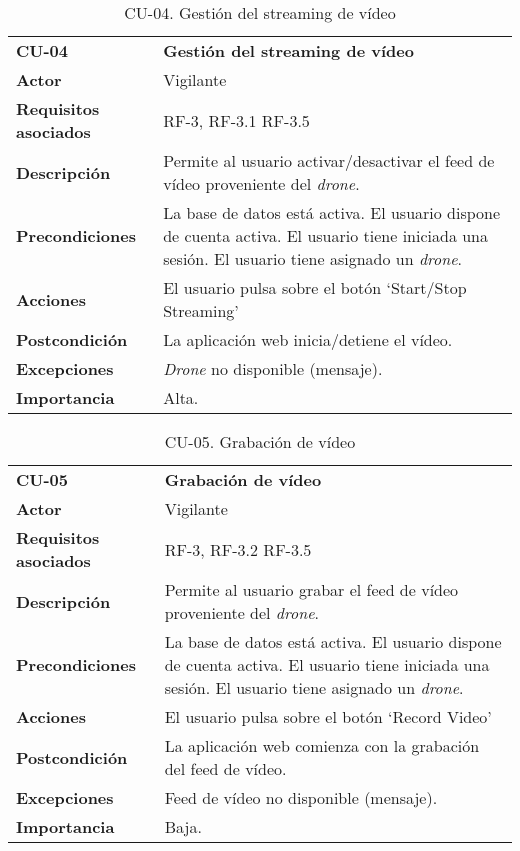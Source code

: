 \begin{table}
	\begin{center}
		\begin{tabular}{m{3cm}  m{10cm}}\hline
			\toprule
			\textbf{CU-04} & \textbf{Gestión del streaming de vídeo}\\
			\otoprule
			\textbf{Actor} & Vigilante\\
			\textbf{Requisitos asociados} & RF-3, RF-3.1 RF-3.5\\
			\textbf{Descripción} & Permite al usuario activar/desactivar el feed de vídeo proveniente del \emph{drone}.\\
			\textbf{Precondiciones} & La base de datos está activa. El usuario dispone de cuenta activa. El usuario tiene iniciada una sesión. El usuario tiene asignado un \emph{drone}.\\
			\textbf{Acciones} & \item El usuario pulsa sobre el botón `Start/Stop Streaming'\\
			
			\textbf{Postcondición} & La aplicación web inicia/detiene el vídeo.\\
			\textbf{Excepciones} &  \emph{Drone} no disponible (mensaje).\\
			\textbf{Importancia} & Alta.\\
			\hline
			\bottomrule
		\end{tabular}
		\caption{CU-04. Gestión del streaming de vídeo}
		\label{tb:CU04}
	\end{center}
\end{table}


\begin{table}
	\begin{center}
		\begin{tabular}{m{3cm}  m{10cm}}\hline
			\toprule
			\textbf{CU-05} & \textbf{Grabación de vídeo}\\
			\otoprule
			\textbf{Actor} & Vigilante\\
			\textbf{Requisitos asociados} & RF-3, RF-3.2 RF-3.5\\
			\textbf{Descripción} & Permite al usuario grabar el feed de vídeo proveniente del \emph{drone}.\\
			\textbf{Precondiciones} & La base de datos está activa. El usuario dispone de cuenta activa. El usuario tiene iniciada una sesión. El usuario tiene asignado un \emph{drone}.\\
			\textbf{Acciones} & \item El usuario pulsa sobre el botón `Record Video'\\
			
			\textbf{Postcondición} & La aplicación web comienza con la grabación del feed de vídeo.\\
			\textbf{Excepciones} &\item Feed de vídeo no disponible (mensaje).\\
			\textbf{Importancia} & Baja.\\
			\hline
			\bottomrule
		\end{tabular}
		\caption{CU-05. Grabación de vídeo}
		\label{tb:CU05}
	\end{center}
\end{table}

